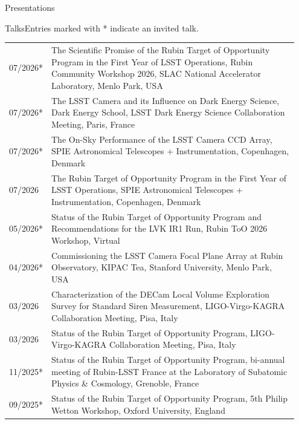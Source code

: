 \documentclass{resume} %
\begin{document}
\begin{rSection}{Presentations}

\begin{rSubsection}{Talks}{}{Entries marked with * indicate an invited talk.}{}



    \begin{table}[h]
    \setlength{\extrarowheight}{3pt} 
\begin{tabular}{p{0.07\linewidth} p{0.88\linewidth}}
07/2026* & The Scientific Promise of the Rubin Target of Opportunity Program in the First Year of LSST Operations, Rubin Community Workshop 2026, SLAC National Accelerator Laboratory, Menlo Park, USA\\
07/2026* & The LSST Camera and its Influence on Dark Energy Science, Dark Energy School, LSST Dark Energy Science Collaboration Meeting, Paris, France\\
07/2026* & The On-Sky Performance of the LSST Camera CCD Array, SPIE Astronomical Telescopes + Instrumentation, Copenhagen, Denmark\\
07/2026 & The Rubin Target of Opportunity Program in the First Year of LSST Operations, SPIE Astronomical Telescopes + Instrumentation, Copenhagen, Denmark\\
05/2026* & Status of the Rubin Target of Opportunity Program and Recommendations for the LVK IR1 Run, Rubin ToO 2026 Workshop, Virtual\\
04/2026* & Commissioning the LSST Camera Focal Plane Array at Rubin Observatory, KIPAC Tea, Stanford University, Menlo Park, USA\\
03/2026 & Characterization of the DECam Local Volume Exploration Survey for Standard Siren Measurement, LIGO-Virgo-KAGRA Collaboration Meeting, Pisa, Italy\\
03/2026 & Status of the Rubin Target of Opportunity Program, LIGO-Virgo-KAGRA Collaboration Meeting, Pisa, Italy\\
11/2025* & Status of the Rubin Target of Opportunity Program, bi-annual meeting of Rubin-LSST France at the Laboratory of Subatomic Physics \& Cosmology, Grenoble, France\\
09/2025* & Status of the Rubin Target of Opportunity Program, 5th Philip Wetton Workshop, Oxford University, England\\

\end{tabular}
\end{table}
\end{rSubsection}
\end{rSection}
\end{document}
